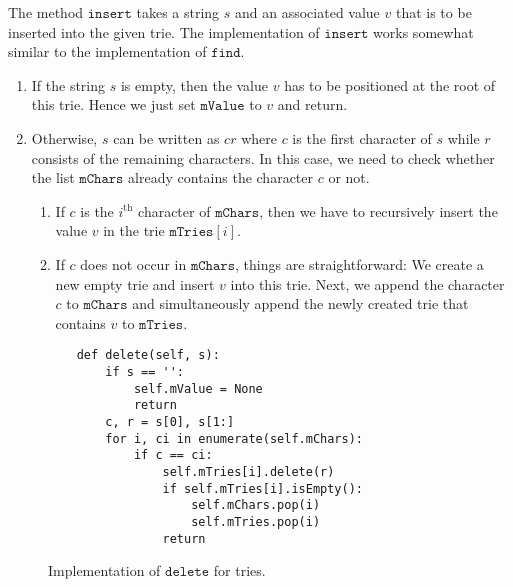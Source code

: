 The method $\texttt{insert}$ takes a string $s$ and an associated value $v$ that is to be inserted
into the given trie.  The implementation of $\texttt{insert}$ works somewhat similar to the
implementation of $\texttt{find}$.
\begin{enumerate}
\item If the string $s$ is empty, then the value $v$ has to be positioned at the root of this trie.
      Hence we just set $\texttt{mValue}$ to $v$ and return.
\item Otherwise, $s$ can be written as $cr$ where $c$ is the first character of $s$ while $r$
      consists of the remaining characters.  In this case, we need to check whether the list
      $\texttt{mChars}$ already contains the character $c$ or not.
      \begin{enumerate}
      \item If $c$ is the $i^\textrm{th}$ character of $\texttt{mChars}$, then we have to recursively insert the value $v$
            in the trie $\texttt{mTries}[i]$.  
      \item If $c$ does not occur in $\texttt{mChars}$, things are straightforward: We create a new
            empty trie and insert $v$ into this trie.  Next, we append the character $c$ to
            $\texttt{mChars}$ and simultaneously append the newly created trie that contains $v$ to
            $\texttt{mTries}$. 
      \end{enumerate}
\end{enumerate}

\begin{figure}[!ht]
\centering
\begin{verbatim}
    def delete(self, s):
        if s == '':
            self.mValue = None
            return
        c, r = s[0], s[1:]
        for i, ci in enumerate(self.mChars):
            if c == ci:
                self.mTries[i].delete(r)
                if self.mTries[i].isEmpty():
                    self.mChars.pop(i)
                    self.mTries.pop(i)
                return
\end{verbatim}
\vspace*{-0.3cm}
\caption{Implementation of $\texttt{delete}$ for tries.}
\label{fig:trie.ipython-delete}
\end{figure}

